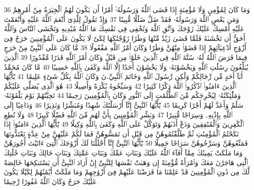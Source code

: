{\tiny\colorbox{cl_aya}{36}} وَمَا كَانَ لِمُؤْمِنٍ وَلَا مُؤْمِنَةٍ إِذَا قَضَى ٱللَّهُ وَرَسُولُهُۥٓ أَمْرًا أَن يَكُونَ لَهُمُ ٱلْخِيَرَةُ مِنْ أَمْرِهِمْ وَمَن يَعْصِ ٱللَّهَ وَرَسُولَهُۥ فَقَدْ ضَلَّ ضَلَٰلًا مُّبِينًا
{\tiny\colorbox{cl_aya}{37}} وَإِذْ تَقُولُ لِلَّذِىٓ أَنْعَمَ ٱللَّهُ عَلَيْهِ وَأَنْعَمْتَ عَلَيْهِ أَمْسِكْ عَلَيْكَ زَوْجَكَ وَٱتَّقِ ٱللَّهَ وَتُخْفِى فِى نَفْسِكَ مَا ٱللَّهُ مُبْدِيهِ وَتَخْشَى ٱلنَّاسَ وَٱللَّهُ أَحَقُّ أَن تَخْشَىٰهُ فَلَمَّا قَضَىٰ زَيْدٌ مِّنْهَا وَطَرًا زَوَّجْنَٰكَهَا لِكَىْ لَا يَكُونَ عَلَى ٱلْمُؤْمِنِينَ حَرَجٌ فِىٓ أَزْوَٰجِ أَدْعِيَآئِهِمْ إِذَا قَضَوْا۟ مِنْهُنَّ وَطَرًا وَكَانَ أَمْرُ ٱللَّهِ مَفْعُولًا
{\tiny\colorbox{cl_aya}{38}} مَّا كَانَ عَلَى ٱلنَّبِىِّ مِنْ حَرَجٍ فِيمَا فَرَضَ ٱللَّهُ لَهُۥ سُنَّةَ ٱللَّهِ فِى ٱلَّذِينَ خَلَوْا۟ مِن قَبْلُ وَكَانَ أَمْرُ ٱللَّهِ قَدَرًا مَّقْدُورًا
{\tiny\colorbox{cl_aya}{39}} ٱلَّذِينَ يُبَلِّغُونَ رِسَٰلَٰتِ ٱللَّهِ وَيَخْشَوْنَهُۥ وَلَا يَخْشَوْنَ أَحَدًا إِلَّا ٱللَّهَ وَكَفَىٰ بِٱللَّهِ حَسِيبًا
{\tiny\colorbox{cl_aya}{40}} مَّا كَانَ مُحَمَّدٌ أَبَآ أَحَدٍ مِّن رِّجَالِكُمْ وَلَٰكِن رَّسُولَ ٱللَّهِ وَخَاتَمَ ٱلنَّبِيِّۦنَ وَكَانَ ٱللَّهُ بِكُلِّ شَىْءٍ عَلِيمًا
{\tiny\colorbox{cl_aya}{41}} يَٰٓأَيُّهَا ٱلَّذِينَ ءَامَنُوا۟ ٱذْكُرُوا۟ ٱللَّهَ ذِكْرًا كَثِيرًا
{\tiny\colorbox{cl_aya}{42}} وَسَبِّحُوهُ بُكْرَةً وَأَصِيلًا
{\tiny\colorbox{cl_aya}{43}} هُوَ ٱلَّذِى يُصَلِّى عَلَيْكُمْ وَمَلَٰٓئِكَتُهُۥ لِيُخْرِجَكُم مِّنَ ٱلظُّلُمَٰتِ إِلَى ٱلنُّورِ وَكَانَ بِٱلْمُؤْمِنِينَ رَحِيمًا
{\tiny\colorbox{cl_aya}{44}} تَحِيَّتُهُمْ يَوْمَ يَلْقَوْنَهُۥ سَلَٰمٌ وَأَعَدَّ لَهُمْ أَجْرًا كَرِيمًا
{\tiny\colorbox{cl_aya}{45}} يَٰٓأَيُّهَا ٱلنَّبِىُّ إِنَّآ أَرْسَلْنَٰكَ شَٰهِدًا وَمُبَشِّرًا وَنَذِيرًا
{\tiny\colorbox{cl_aya}{46}} وَدَاعِيًا إِلَى ٱللَّهِ بِإِذْنِهِۦ وَسِرَاجًا مُّنِيرًا
{\tiny\colorbox{cl_aya}{47}} وَبَشِّرِ ٱلْمُؤْمِنِينَ بِأَنَّ لَهُم مِّنَ ٱللَّهِ فَضْلًا كَبِيرًا
{\tiny\colorbox{cl_aya}{48}} وَلَا تُطِعِ ٱلْكَٰفِرِينَ وَٱلْمُنَٰفِقِينَ وَدَعْ أَذَىٰهُمْ وَتَوَكَّلْ عَلَى ٱللَّهِ وَكَفَىٰ بِٱللَّهِ وَكِيلًا
{\tiny\colorbox{cl_aya}{49}} يَٰٓأَيُّهَا ٱلَّذِينَ ءَامَنُوٓا۟ إِذَا نَكَحْتُمُ ٱلْمُؤْمِنَٰتِ ثُمَّ طَلَّقْتُمُوهُنَّ مِن قَبْلِ أَن تَمَسُّوهُنَّ فَمَا لَكُمْ عَلَيْهِنَّ مِنْ عِدَّةٍ تَعْتَدُّونَهَا فَمَتِّعُوهُنَّ وَسَرِّحُوهُنَّ سَرَاحًا جَمِيلًا
{\tiny\colorbox{cl_aya}{50}} يَٰٓأَيُّهَا ٱلنَّبِىُّ إِنَّآ أَحْلَلْنَا لَكَ أَزْوَٰجَكَ ٱلَّٰتِىٓ ءَاتَيْتَ أُجُورَهُنَّ وَمَا مَلَكَتْ يَمِينُكَ مِمَّآ أَفَآءَ ٱللَّهُ عَلَيْكَ وَبَنَاتِ عَمِّكَ وَبَنَاتِ عَمَّٰتِكَ وَبَنَاتِ خَالِكَ وَبَنَاتِ خَٰلَٰتِكَ ٱلَّٰتِى هَاجَرْنَ مَعَكَ وَٱمْرَأَةً مُّؤْمِنَةً إِن وَهَبَتْ نَفْسَهَا لِلنَّبِىِّ إِنْ أَرَادَ ٱلنَّبِىُّ أَن يَسْتَنكِحَهَا خَالِصَةً لَّكَ مِن دُونِ ٱلْمُؤْمِنِينَ قَدْ عَلِمْنَا مَا فَرَضْنَا عَلَيْهِمْ فِىٓ أَزْوَٰجِهِمْ وَمَا مَلَكَتْ أَيْمَٰنُهُمْ لِكَيْلَا يَكُونَ عَلَيْكَ حَرَجٌ وَكَانَ ٱللَّهُ غَفُورًا رَّحِيمًا
